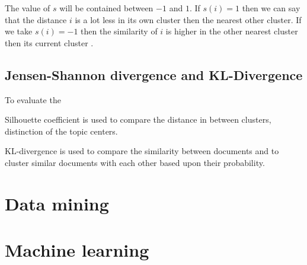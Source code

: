The value of $s$ will be contained between $-1$ and $1$. If $s(i) = 1$ then we can say that the distance $i$  is a lot less in its own cluster then the nearest other cluster. If we take $s(i) = -1$ then the similarity of $i$ is higher in the other nearest cluster then its current cluster \cite{Rousseeuw1987Silhouettes:Analysis}.


\subsection{Jensen-Shannon divergence and KL-Divergence}
To evaluate the \cite{Shao2014TextCo-occurrence}

Silhouette coefficient
is used to compare the distance in between clusters, distinction of the topic centers.

KL-divergence
is used to compare the similarity between documents and to cluster similar documents with each other based upon their probability.

\subsection{}

\section{Data mining}


\section{Machine learning}

